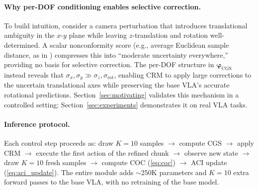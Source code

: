 \paragraph{Why per-DOF conditioning enables selective correction.}
To build intuition, consider a camera perturbation that introduces translational ambiguity in the $x$-$y$ plane while leaving $z$-translation and rotation well-determined.  A scalar nonconformity score (e.g., average Euclidean sample distance, as in \cite{reconvla2026}) compresses this into ``moderate uncertainty everywhere,'' providing no basis for selective correction.  The per-DOF structure in $\boldsymbol{\varphi}_{\mathrm{CGS}}$ instead reveals that $\sigma_{x},\sigma_{y} \gg \sigma_{z},\sigma_{\mathrm{rot}}$, enabling CRM to apply large corrections to the uncertain translational axes while preserving the base VLA's accurate rotational predictions.  Section~\ref{sec:motivating} validates this mechanism in a controlled setting; Section~\ref{sec:experiments} demonstrates it on real VLA tasks.

\paragraph{Inference protocol.}
Each control step proceeds as: draw $K{=}10$ samples $\to$ compute CGS $\to$ apply CRM $\to$ execute the first action of the refined chunk $\to$ observe new state $\to$ draw $K{=}10$ fresh samples $\to$ compute COC (\ref{eq:coc}) $\to$ ACI update (\ref{eq:aci_update}).  The entire module adds ${\sim}$250K parameters and $K{=}10$ extra forward passes to the base VLA, with no retraining of the base model.
